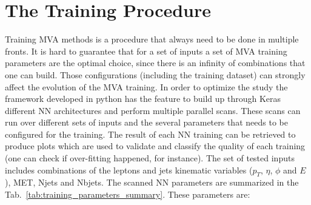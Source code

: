 \section{The Training Procedure}
\label{subsec:training_procedure}
Training MVA methods is a procedure that always need to be done in multiple fronts. It is hard to guarantee that for a set of inputs a set of MVA training parameters are the optimal choice, since there is an infinity of combinations that one can build. Those configurations (including the training dataset) can strongly affect the evolution of the MVA training. In order to optimize the study the framework developed in python has the feature to build up through Keras different NN architectures and perform multiple parallel scans. These scans can run over different sets of inputs and the several parameters that needs to be configured for the training. The result of each NN training can be retrieved to produce plots which are used to validate and classify the quality of each training (one can check if over-fitting happened, for instance).
The set of tested inputs includes combinations of the leptons and jets kinematic variables ($p_{T}$, $\eta$, $\phi$ and $E$), MET, Njets and Nbjets. The scanned NN parameters are summarized in the Tab.~\ref{tab:training_parameters_summary}. These parameters are:
